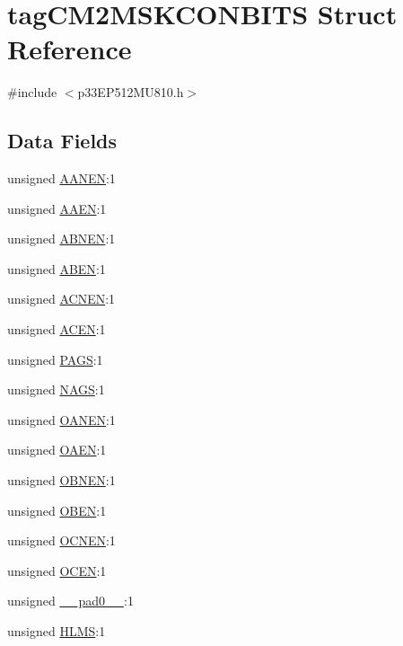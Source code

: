 \hypertarget{structtag_c_m2_m_s_k_c_o_n_b_i_t_s}{}\section{tag\+C\+M2\+M\+S\+K\+C\+O\+N\+B\+I\+TS Struct Reference}
\label{structtag_c_m2_m_s_k_c_o_n_b_i_t_s}


{\ttfamily \#include $<$p33\+E\+P512\+M\+U810.\+h$>$}

\subsection*{Data Fields}
\begin{DoxyCompactItemize}
\item 
unsigned \hyperlink{structtag_c_m2_m_s_k_c_o_n_b_i_t_s_a6ea89b9cbdf0bbde3ec8147513e70fa0}{A\+A\+N\+EN}\+:1
\item 
unsigned \hyperlink{structtag_c_m2_m_s_k_c_o_n_b_i_t_s_a58bba29325ff11212a73bae4b2b1a707}{A\+A\+EN}\+:1
\item 
unsigned \hyperlink{structtag_c_m2_m_s_k_c_o_n_b_i_t_s_a1b2c756ac7255e490499f85cb2d746f3}{A\+B\+N\+EN}\+:1
\item 
unsigned \hyperlink{structtag_c_m2_m_s_k_c_o_n_b_i_t_s_abae9997777bf70f8cf9132c18db1e83d}{A\+B\+EN}\+:1
\item 
unsigned \hyperlink{structtag_c_m2_m_s_k_c_o_n_b_i_t_s_af825e9ea0f6690d86c6ca9bda2e82eb1}{A\+C\+N\+EN}\+:1
\item 
unsigned \hyperlink{structtag_c_m2_m_s_k_c_o_n_b_i_t_s_a24d602e77c5a5ec039de0ff29062d01b}{A\+C\+EN}\+:1
\item 
unsigned \hyperlink{structtag_c_m2_m_s_k_c_o_n_b_i_t_s_af5feed07d2e415c635200336f0f05e41}{P\+A\+GS}\+:1
\item 
unsigned \hyperlink{structtag_c_m2_m_s_k_c_o_n_b_i_t_s_ac2ecf95cef4a90da8a3ad0a239927fd2}{N\+A\+GS}\+:1
\item 
unsigned \hyperlink{structtag_c_m2_m_s_k_c_o_n_b_i_t_s_a8b7682af91333014cf4ab125c6a6fe8d}{O\+A\+N\+EN}\+:1
\item 
unsigned \hyperlink{structtag_c_m2_m_s_k_c_o_n_b_i_t_s_a899903902775809e354711c79071013b}{O\+A\+EN}\+:1
\item 
unsigned \hyperlink{structtag_c_m2_m_s_k_c_o_n_b_i_t_s_afa6d54b4c9f6bf6feb885f00044987b2}{O\+B\+N\+EN}\+:1
\item 
unsigned \hyperlink{structtag_c_m2_m_s_k_c_o_n_b_i_t_s_a69019780861408d14c164f55a9995819}{O\+B\+EN}\+:1
\item 
unsigned \hyperlink{structtag_c_m2_m_s_k_c_o_n_b_i_t_s_a8bee27f84106873154bb0f1b9d244ebd}{O\+C\+N\+EN}\+:1
\item 
unsigned \hyperlink{structtag_c_m2_m_s_k_c_o_n_b_i_t_s_ad7c118cfef34dec7ba06f5968b47200c}{O\+C\+EN}\+:1
\item 
unsigned \hyperlink{structtag_c_m2_m_s_k_c_o_n_b_i_t_s_adf71f3d8410c1f1dbbc96680a92c49af}{\+\_\+\+\_\+pad0\+\_\+\+\_\+}\+:1
\item 
unsigned \hyperlink{structtag_c_m2_m_s_k_c_o_n_b_i_t_s_ae12e5557e1ca033e11465acebb086d49}{H\+L\+MS}\+:1
\end{DoxyCompactItemize}


